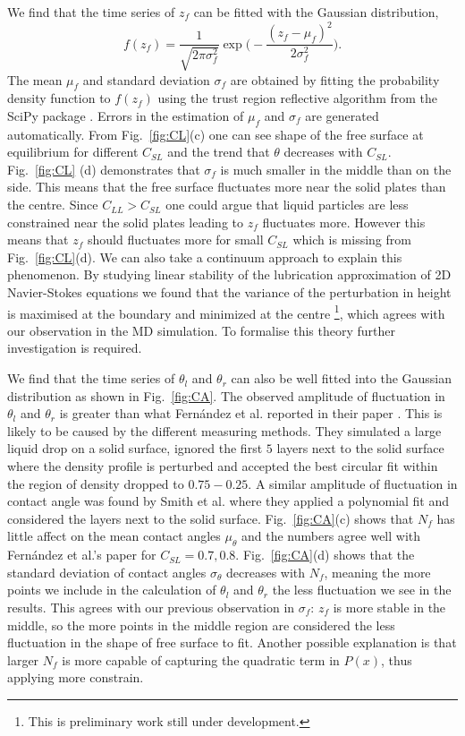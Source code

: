 \documentclass[
reprint,
 amsmath,amssymb,
 aps,
url
]{revtex4-1}
\begin{document}
We find that the time series of $z_f$ can be fitted with the Gaussian distribution,
\begin{equation}
	f(z_f) = \frac{1}{\sqrt{2\pi \sigma^2_f}}\exp\big(-\frac{(z_f-\mu_f)^2}{2\sigma_f^2}\big).
\end{equation}
The mean $\mu_f$ and standard deviation $\sigma_f$ are obtained by fitting the probability density function to $f(z_f)$ using the trust region reflective algorithm from the SciPy package \cite{virtanen_scipy_2020}. Errors in the estimation of $\mu_f$ and $\sigma_f$ are generated automatically. From Fig.~\ref{fig:CL}(c) one can see shape of the free surface at equilibrium for different $C_{SL}$ and the trend that $\theta$ decreases with $C_{SL}$. Fig.~\ref{fig:CL}
(d) demonstrates that $\sigma_f$ is much smaller in the middle than on the side. This means that the free surface fluctuates more near the solid plates than the centre. Since $C_{LL}>C_{SL}$ one could argue that liquid particles are less constrained near the solid plates leading to $z_f$ fluctuates more. However this means that $z_f$ should fluctuates more for small $C_{SL}$ which is missing from Fig.~\ref{fig:CL}(d). We can also take a continuum approach to explain this phenomenon. By studying linear stability of the lubrication approximation of 2D Navier-Stokes equations \cite{acheson_elementary_1990} we found that the variance of the perturbation in height is maximised at the boundary and minimized at the centre \footnote{This is preliminary work still under development.}, which agrees with our observation in the MD simulation. To formalise this theory further investigation is required.


We find that the time series of $\theta_l$ and $\theta_r$ can also be well fitted into the Gaussian distribution as shown in Fig.~\ref{fig:CA}. The observed amplitude of fluctuation in $\theta_l$ and $\theta_r$ is greater than what Fern\'andez et al. reported in their paper \cite{fernandez-toledano_contact-line_2019}. This is likely to be caused by the different measuring methods. They simulated a large liquid drop on a solid surface, ignored the first $5$ layers next to the solid surface where the density profile is perturbed and accepted the best circular fit within the region of density dropped to $0.75-0.25$. A similar amplitude of fluctuation in contact angle was found by Smith et al. \cite{smith_langevin_2016} where they applied a polynomial fit and considered the layers next to the solid surface. Fig.~\ref{fig:CA}(c) shows that $N_f$ has little affect on the mean contact angles $\mu_{\theta}$ and the numbers agree well with Fern\'andez et al.'s \cite{fernandez-toledano_contact-line_2019} paper for $C_{SL}=0.7,0.8$. Fig.~\ref{fig:CA}(d) shows that the standard deviation of contact angles $\sigma_{\theta}$ decreases with $N_f$, meaning the more points we include in the calculation of $\theta_l$ and $\theta_r$ the less fluctuation we see in the results. This agrees with our previous observation in $\sigma_f$: $z_f$ is more stable in the middle, so the more points in the middle region are considered the less fluctuation in the shape of free surface to fit. Another possible explanation is that larger $N_f$ is more capable of capturing the quadratic term in $P(x)$, thus applying more constrain. 
\end{document}
